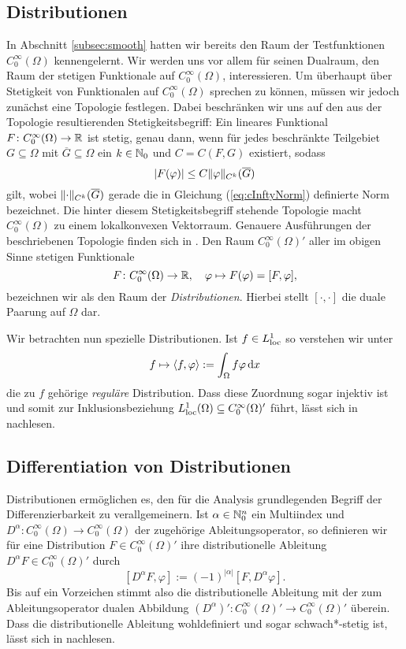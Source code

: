 \subsection{Distributionen}

In Abschnitt \ref{subsec:smooth} hatten wir bereits den Raum der Testfunktionen $C_0^\infty(\Omega)$ kennengelernt.
Wir werden uns vor allem für seinen Dualraum, den Raum der stetigen Funktionale auf $C_0^\infty(\Omega)$, interessieren.
Um überhaupt über Stetigkeit von Funktionalen auf $C_0^\infty(\Omega)$ sprechen zu können, müssen wir jedoch zunächst eine Topologie festlegen.
Dabei beschränken wir uns auf den aus der Topologie resultierenden Stetigkeitsbegriff:
Ein lineares Funktional $F \colon C_0^\infty(\Omega) \to \mathbb{R}$ ist stetig, genau dann, wenn für jedes beschränkte Teilgebiet $G \subseteq \Omega$ mit $\overline G \subseteq \Omega$ ein $k \in \mathbb{N}_0$ und $C = C(F,G)$ existiert, sodass
$$
|F(\varphi)| \leq C \lVert \varphi \rVert_{C^k}(\overline G)
$$
gilt, wobei $\lVert \cdot \rVert_{C^k}(\overline G)$ gerade die in Gleichung (\ref{eq:cInftyNorm}) definierte Norm bezeichnet.
Die hinter diesem Stetigkeitsbegriff stehende Topologie macht $C_0^\infty(\Omega)$ zu einem lokalkonvexen Vektorraum.
Genauere Ausführungen der beschriebenen Topologie finden sich in \cite[S.433f.]{werner2011fa}.
Den Raum $C_0^\infty(\Omega)'$ aller im obigen Sinne stetigen Funktionale
$$
F \colon C_0^\infty(\Omega) \to \mathbb{R}, \quad \varphi \mapsto F(\varphi) = [F, \varphi],
$$
bezeichnen wir als den Raum der \emph{Distributionen}.
Hierbei stellt $[\cdot,\cdot]$ die duale Paarung auf $\Omega$ dar. 

Wir betrachten nun spezielle Distributionen.
Ist $f \in L^1_{\operatorname{loc}}$ so verstehen wir unter 
$$
f \mapsto \langle f, \varphi \rangle := \int_\Omega f \varphi \, {\operatorname{d}\!{x}}
$$
die zu $f$ gehörige \emph{reguläre} Distribution.
Dass diese Zuordnung sogar injektiv ist und somit zur Inklusionsbeziehung $L^1_{\operatorname{loc}}(\Omega) \subseteq C^\infty_0(\Omega)'$ führt, lässt sich in \cite[S.432, Beispiel (a)]{werner2011fa} nachlesen.

\subsection{Differentiation von Distributionen}

Distributionen ermöglichen es, den für die Analysis grundlegenden Begriff der Differenzierbarkeit zu verallgemeinern.
Ist $\alpha \in \mathbb{N}_0^n$ ein Multiindex und $D^\alpha \colon C_0^\infty(\Omega) \to C_0^\infty(\Omega)$ der zugehörige Ableitungsoperator, so definieren wir für eine Distribution $F \in C_0^\infty(\Omega)'$ ihre distributionelle Ableitung $D^\alpha F \in C_0^\infty(\Omega)'$ durch
$$
  [D^\alpha F, \varphi] := (-1)^{|\alpha|} [F, D^\alpha \varphi].
$$
Bis auf ein Vorzeichen stimmt also die distributionelle Ableitung mit der zum Ableitungsoperator dualen Abbildung $(D^\alpha)' \colon C_0^\infty(\Omega)' \to C_0^\infty(\Omega)'$ überein.
Dass die distributionelle Ableitung wohldefiniert und sogar schwach*-stetig ist, lässt sich in \cite[S.434, Lemma VIII.5.7]{werner2011fa} nachlesen.

